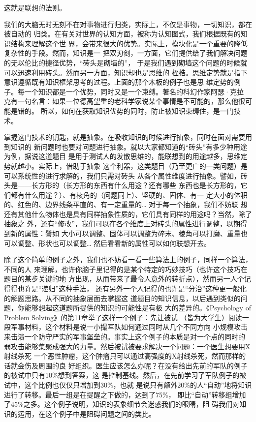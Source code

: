 \documentclass[11pt]{article}
\begin{document}
\begin{itemize}
这就是联想的法则。

我们的大脑无时无刻不在对事物进行归类，实际上，不仅是事物，一切知识，都在被自动的
归类。在有关对世界的认知方面，被称为认知图式，我们根据既有的知识结构来理解这个世
界，会带来很大的优势。实际上，模块化是一个重要的降低复杂性的手段。然而，知识是一
把双刃剑，一方面，它们提供给了我们解决问题的无以伦比的捷径优势，“砖头是砌墙的”，
于是我们遇到砌墙这个问题的时候就可以迅速利用砖头。然而另一方面，知识却也是思维的
桎梏。思维定势就是指下意识遵循既有知识框架思考的过程。上面的那个木板的例子也是思
维定势的例子。每一个知识都是一个优势，同时又是一个束缚。著名的科幻作家阿瑟·克拉
克有一句名言：如果一位德高望重的老科学家说某个事情是不可能的，那么他很可能是错的。
所以，如何在获取知识优势的同时，防止被知识束缚住，是一门技术。

掌握这门技术的钥匙，就是抽象。在吸收知识的时候进行抽象，同时在面对需要用到知识的
新问题时也要对问题进行抽象。就以大家都知道的“砖头”有多少种用途为例，据说这道题目
是用于测试人的发散思维的，能联想到的用途越多，思维定势就越小。实际上，借助于抽象
这个利器，这类题目（乃至更广的一类问题）是可以系统性的进行求解的，我们只需对砖头
从各个属性维度进行抽象。譬如，砖头是——长方形的（长方形的东西有什么用途？还有哪些
东西也是长方形的，它们都有什么用途？）、有棱角的（问题同上）、坚硬的、固体、有一
定大小的体积的、红色的、边界线条平直的、有一定重量的… 对于每一个抽象，我们不妨联
想还有其他什么物体也是具有同样抽象性质的，它们具有同样的用途吗？当然，除了抽象之
外，还有“修改”，我们可以在各个维度上对砖头的属性进行调整，以期得到新的属性：譬如
大小可以调整、固体可以调整为碎末、棱角可以打磨、重量也可以调整、形状也可以调整…
然后看看新的属性可以如何联想开去。

除了这个简单的例子之外，我们也不妨看一看一些算法上的例子，同样一个算法，不同的人
来理解，也许你脑子里记得的是某个特定的巧妙技巧（也许这个技巧在题目的某步关键的地
方出现，从而带来了最令人意外的转折点），然而另一人个记得得也许是“递归”这种手法，
还有另外一个人记得的也许是“分治”这种更一般化的解题思路。从不同的抽象层面去掌握这
道题目的知识信息，以后遇到类似的问题，你能够想起这道题所提供的知识的可能性是有极
大的差异的。《Psychology of Problem Solving》的第11章举了这样一个例子：先让被试
（皆为大学生）阅读一段军事材料，这个材料是说一小撮军队如何通过同时从几个不同方向
小规模攻击来击溃一个防守严实的军事堡垒的。事实上这个例子的本质是对一个点的同时的
弱攻击能够集聚成强大的力量。然后被试被要求解决一个问题：一个医生想要用X射线杀死
一个恶性肿瘤，这个肿瘤只可以通过高强度的X射线杀死，然而那样的话就会伤及周围的良
好组织。医生应该怎么办呢？在没有给出先前的军队的例子的被试中只有10\%想到答案，这
是控制基线。然后，在先前学习了军队例子的被试中，这个比例也仅仅只增加到30\%，也就
是说只有额外20\%的人“自动”地将知识进行了转移。最后一组是在提醒之下做的，达到了75\%，
即比“自动”转移组增加了45\%之多。这个例子说明，知识的表象细节会迷惑我们的眼睛，阻
碍我们对知识的运用，在这个例子中是阻碍问题之间的类比。


\end{itemize}
\end{document}
